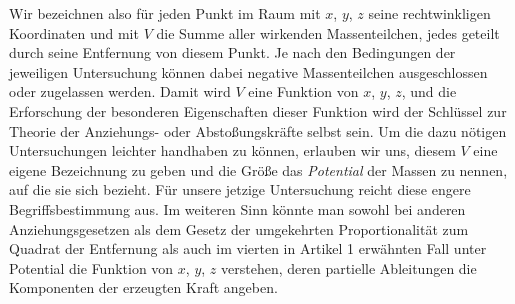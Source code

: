 Wir bezeichnen also für jeden Punkt im Raum mit $x$, $y$, $z$ seine rechtwinkligen Koordinaten und mit $V$ die Summe aller wirkenden Massenteilchen, jedes geteilt durch seine Entfernung von diesem Punkt. Je nach den Bedingungen der jeweiligen Untersuchung können dabei negative Massenteilchen ausgeschlossen oder zugelassen werden. Damit wird $V$ eine Funktion von $x$, $y$, $z$, und die Erforschung der besonderen Eigenschaften dieser Funktion wird der Schlüssel zur Theorie der Anziehungs- oder Abstoßungskräfte selbst sein. Um die dazu nötigen Untersuchungen leichter handhaben zu können, erlauben wir uns, diesem $V$ eine eigene Bezeichnung zu geben und die Größe das \textit{Potential} der Massen zu nennen, auf die sie sich bezieht. Für unsere jetzige Untersuchung reicht diese engere Begriffsbestimmung aus. Im weiteren Sinn könnte man sowohl bei anderen Anziehungsgesetzen als dem Gesetz der umgekehrten Proportionalität zum Quadrat der Entfernung als auch im vierten in Artikel 1 erwähnten Fall unter Potential die Funktion von $x$, $y$, $z$ verstehen, deren partielle Ableitungen die Komponenten der erzeugten Kraft angeben.

